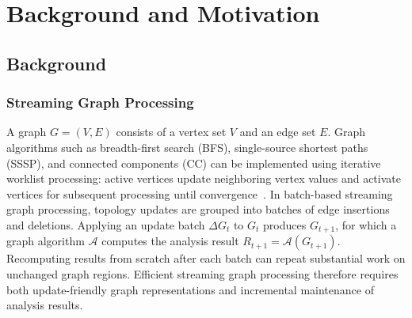 \section{Background and Motivation}

\subsection{Background}

\subsubsection{Streaming Graph Processing}

A graph $G=(V,E)$ consists of a vertex set $V$ and an edge set $E$. Graph algorithms such as breadth-first search (BFS), single-source shortest paths (SSSP), and connected components (CC) can be implemented using iterative worklist processing: active vertices update neighboring vertex values and activate vertices for subsequent processing until
convergence~\cite{2013-Ligra}. In batch-based streaming graph processing, topology updates are grouped into batches of edge insertions and deletions. Applying an update batch $\Delta G_t$ to $G_t$ produces $G_{t+1}$, for which a graph algorithm $\mathcal{A}$ computes the analysis result $R_{t+1}=\mathcal{A}(G_{t+1})$. Recomputing results from scratch after each batch can repeat substantial work on unchanged graph regions. Efficient streaming graph processing therefore requires both update-friendly graph representations and incremental maintenance of analysis results.

